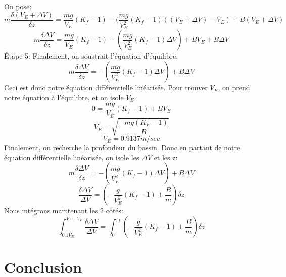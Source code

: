 \documentclass[12pt]{article}
\begin{document}
On pose: 
\begin{equation}
m\frac{\delta (V_E + \Delta V)}{\delta z} = \frac{mg}{V_E}(K_f-1) - (\frac{mg}{V_E^2}(K_f-1)((V_E + \Delta V)-V_E)+B(V_E + \Delta V)
\end{equation}
\begin{equation}
m\frac{\delta \Delta V}{\delta z} = \frac{mg}{V_E}(K_f-1) - (\frac{mg}{V_E^2}(K_f-1) \Delta V)+BV_E + B\Delta V
\end{equation}
Étape 5: Finalement, on soustrait l'équation d'équilibre:
\begin{equation}
m\frac{\delta \Delta V}{\delta z} = - (\frac{mg}{V_E^2}(K_f-1) \Delta V)+ B\Delta V
\end{equation}
Ceci est donc notre équation différentielle linéarisée.
\newline
\newline
Pour trouver $V_E$, on prend notre équation à l'équilibre, et on isole $V_E$.
\begin{equation}
0 = \frac{mg}{V_E}(K_f-1)+BV_E
\end{equation}
\begin{equation}
V_E = \sqrt{\frac{-mg(K_F-1)}{B}}
\end{equation} 
\begin{equation}
V_E = 0.9137m/sec
\end{equation}  
Finalement, on recherche la profondeur du bassin. Donc en partant de notre équation différentielle linéarisée, on isole les $\Delta V$ et les z: 
\begin{equation}
m\frac{\delta \Delta V}{\delta z} = - (\frac{mg}{V_E^2}(K_f-1) \Delta V)+ B\Delta V
\end{equation}
\begin{equation}
\frac{\delta \Delta V}{\Delta V} =  (-\frac{g}{V_E^2}(K_f-1)+ \frac{B}{m})\delta z
\end{equation}
Nous intégrons maintenant les 2 côtés:
\begin{equation}
\int_{0.1V_E}^{V_I-V_E}\frac{\delta \Delta V}{\Delta V} = \int_{0}^{z_f} (-\frac{g}{V_E^2}(K_f-1)+ \frac{B}{m})\delta z
\end{equation}
\section{Conclusion}
\end{document}

